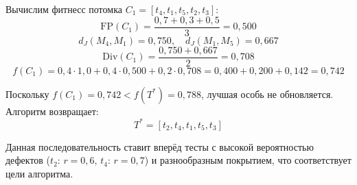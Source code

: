 Вычислим фитнесс потомка $C_1 = [t_4, t_1, t_5, t_2, t_3]$:
$$\text{FP}(C_1) = \frac{0{,}7 + 0{,}3 + 0{,}5}{3} = 0{,}500$$
$$d_J(M_4, M_1) = 0{,}750, \quad d_J(M_1, M_5) = 0{,}667$$
$$\text{Div}(C_1) = \frac{0{,}750 + 0{,}667}{2} = 0{,}708$$
$$f(C_1) = 0{,}4 \cdot 1{,}0 + 0{,}4 \cdot 0{,}500 + 
0{,}2 \cdot 0{,}708 = 0{,}400 + 0{,}200 + 0{,}142 = 0{,}742$$

Поскольку $f(C_1) = 0{,}742 < f(T^*) = 0{,}788$, лучшая особь 
не обновляется. Алгоритм возвращает:
$$T^* = [t_2, t_4, t_1, t_5, t_3]$$

Данная последовательность ставит вперёд тесты с высокой 
вероятностью дефектов ($t_2$: $r=0{,}6$, $t_4$: $r=0{,}7$) и 
разнообразным покрытием, что соответствует цели алгоритма.